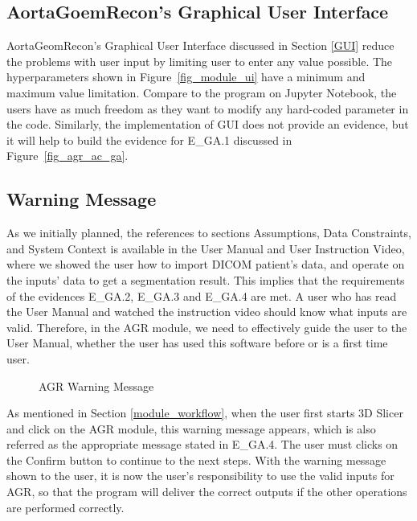 \subsection{AortaGoemRecon's Graphical User Interface}

AortaGeomRecon's Graphical User Interface discussed in Section \ref{GUI} reduce the problems with user input by limiting user to enter any value possible. The hyperparameters shown in Figure~\ref{fig_module_ui} have a minimum and maximum value limitation. Compare to the program on Jupyter Notebook, the users have as much freedom as they want to modify any hard-coded parameter in the code. Similarly, the implementation of GUI does not provide an evidence, but it will help to build the evidence for E\_GA.1 discussed in Figure~\ref{fig_agr_ac_ga}.

\subsection{Warning Message}

As we initially planned, the references to sections Assumptions, Data Constraints, and System Context is available in the User Manual and User Instruction Video, where we showed the user how to import DICOM patient's data, and operate on the inputs' data to get a segmentation result. This implies that the requirements of  the evidences E\_GA.2, E\_GA.3 and E\_GA.4 are met. A user who has read the User Manual and watched the instruction video should know what inputs are valid. Therefore, in the AGR module, we need to effectively guide the user to the User Manual, whether the user has used this software before or is a first time user.

\begin{figure}[H]
    \centering
    \caption[AGR Warning Message]{AGR Warning Message}
    \label{fig_agr_ac_wm}
\end{figure}

As mentioned in Section \ref{module_workflow}, when the user first starts 3D Slicer and click on the AGR module, this warning message appears, which is also referred as the appropriate message stated in E\_GA.4. The user must clicks on the Confirm button to continue to the next steps. With the warning message shown to the user, it is now the user's responsibility to use the valid inputs for AGR, so that the program will deliver the correct outputs if the other operations are performed correctly. 
